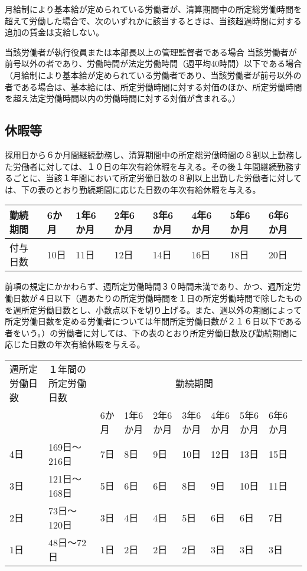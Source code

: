 \documentclass[10pt,a4paper,uplatex]{jsarticle}
\begin{document}
月給制により基本給が定められている労働者が、清算期間中の所定総労働時間を超えて労働した場合で、次のいずれかに該当するときは、当該超過時間に対する追加の賃金は支給しない。
\begin{enumerate}
    \itm 当該労働者が執行役員または本部長以上の管理監督者である場合
    \itm 当該労働者が前号以外の者であり、労働時間が法定労働時間（週平均40時間）以下である場合（月給制により基本給が定められている労働者であり、当該労働者が前号以外の者である場合は、基本給には、所定労働時間に対する対価のほか、所定労働時間を超え法定労働時間以内の労働時間に対する対価が含まれる。）
\end{enumerate}

\subsection{休暇等}
採用日から６か月間継続勤務し、清算期間中の所定総労働時間の８割以上勤務した労働者に対しては、１０日の年次有給休暇を与える。その後１年間継続勤務するごとに、当該１年間において所定労働日数の８割以上出勤した労働者に対しては、下の表のとおり勤続期間に応じた日数の年次有給休暇を与える。

\hspace{2cm}\begin{tabular}{|l|p{2.5em}|p{2.5em}|p{2.5em}|p{2.5em}|p{2.5em}|p{2.5em}|p{2.5em}|} \hline
  勤続期間 & 6か月 & 1年6か月& 2年6か月& 3年6か月& 4年6か月& 5年6か月& 6年6か月 \\ \hline \hline
  付与日数 & 10日 & 11日& 12日& 14日& 16日& 18日& 20日 \\ \hline
\end{tabular}

\label{para:paid_vacation}
\term
前項の規定にかかわらず、週所定労働時間３０時間未満であり、かつ、週所定労働日数が４日以下（週あたりの所定労働時間を１日の所定労働時間で除したものを週所定労働日数とし、小数点以下を切り上げる。また、週以外の期間によって所定労働日数を定める労働者については年間所定労働日数が２１６日以下である者をいう。）の労働者に対しては、下の表のとおり所定労働日数及び勤続期間に応じた日数の年次有給休暇を与える。

\hspace{2cm}\begin{tabular}{|p{3em}|p{6.5em}|p{2.5em}|p{2.5em}|p{2.5em}|p{2.5em}|p{2.5em}|p{2.5em}|p{2.5em}|p{2.5em}|} \hline
  週所定労働日数 & １年間の所定労働日数 & \multicolumn{7}{|c|}{勤続期間} \\ \cline{3-9}
  & & 6か月 & 1年6か月& 2年6か月& 3年6か月& 4年6か月& 5年6か月& 6年6か月 \\ \hline \hline
  4日 & 169日～216日 & 7日 & 8日& 9日& 10日& 12日& 13日& 15日 \\ \hline
  3日 & 121日～168日 & 5日 & 6日& 6日&  8日&  9日& 10日& 11日 \\ \hline
  2日 & 73日～120日  & 3日 & 4日& 4日&  5日&  6日&  6日&  7日 \\ \hline
  1日 & 48日～72日   & 1日 & 2日& 2日&  2日&  3日&  3日&  3日 \\ \hline
\end{tabular}
\end{document}
